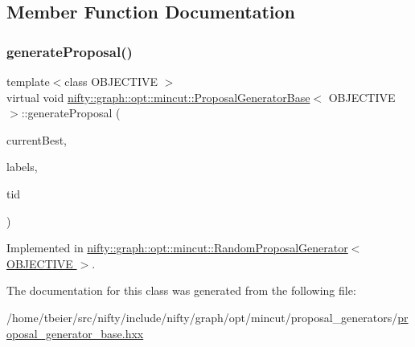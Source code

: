 \subsection{Member Function Documentation}
\mbox{\label{classnifty_1_1graph_1_1opt_1_1mincut_1_1ProposalGeneratorBase_a9c2fd90058277ec51ae024110a095860}} 
\subsubsection{\texorpdfstring{generate\+Proposal()}{generateProposal()}}
{\footnotesize\ttfamily template$<$class O\+B\+J\+E\+C\+T\+I\+VE $>$ \\
virtual void \hyperlink{classnifty_1_1graph_1_1opt_1_1mincut_1_1ProposalGeneratorBase}{nifty\+::graph\+::opt\+::mincut\+::\+Proposal\+Generator\+Base}$<$ O\+B\+J\+E\+C\+T\+I\+VE $>$\+::generate\+Proposal (\begin{DoxyParamCaption}\item[{const \hyperlink{classnifty_1_1graph_1_1opt_1_1mincut_1_1ProposalGeneratorBase_a8e7bdb52139e951b4d4fc21c3cc6946a}{Node\+Labels} \&}]{current\+Best,  }\item[{\hyperlink{classnifty_1_1graph_1_1opt_1_1mincut_1_1ProposalGeneratorBase_a8e7bdb52139e951b4d4fc21c3cc6946a}{Node\+Labels} \&}]{labels,  }\item[{const size\+\_\+t}]{tid }\end{DoxyParamCaption})\hspace{0.3cm}{\ttfamily [pure virtual]}}



Implemented in \hyperlink{classnifty_1_1graph_1_1opt_1_1mincut_1_1RandomProposalGenerator_ad7a71f08676a1e356b6480c85ad0ab53}{nifty\+::graph\+::opt\+::mincut\+::\+Random\+Proposal\+Generator$<$ O\+B\+J\+E\+C\+T\+I\+V\+E $>$}.



The documentation for this class was generated from the following file\+:\begin{DoxyCompactItemize}
\item 
/home/tbeier/src/nifty/include/nifty/graph/opt/mincut/proposal\+\_\+generators/\hyperlink{mincut_2proposal__generators_2proposal__generator__base_8hxx}{proposal\+\_\+generator\+\_\+base.\+hxx}\end{DoxyCompactItemize}
